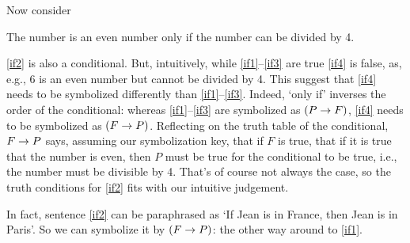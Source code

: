 Now consider
\begin{earg}
		\item[\ex{if2}] The number is an even number only if the number can be divided by 4.
\end{earg}

\ref{if2} is also a conditional. But, intuitively, while \ref{if1}--\ref{if3} are true \ref{if4} is false, as, e.g., 6 is an even number but cannot be divided by 4. This suggest that \ref{if4} needs to be symbolized differently than \ref{if1}--\ref{if3}. Indeed, `only if' inverses the order of the conditional: whereas \ref{if1}--\ref{if3} are symbolized as $(P\rightarrow F)$, \ref{if4} needs to be symbolized as $(F\rightarrow P)$. Reflecting on the truth table of the conditional, $F\rightarrow P$ says, assuming our symbolization key, that if $F$ is true, that if it is true that the number is even, then $P$ must be true for the conditional to be true, i.e., the number must be divisible by 4. That's of course not always the case, so the truth conditions for \ref{if2} fits with our intuitive judgement.


In fact, sentence \ref{if2} can be paraphrased as `If Jean is in France, then Jean is in Paris'. So we can symbolize it by $(F \rightarrow P)$: the other way around to \ref{if1}.
	
